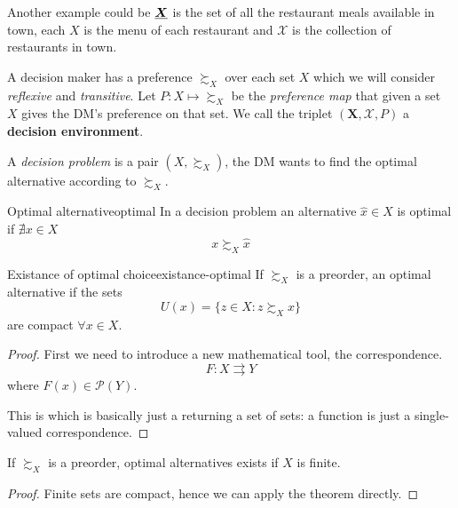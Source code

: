 \documentclass[12pt]{extarticle}
\renewcommand{\vec}[1]{\uvec{#1}}
\begin{document}
Another example could be $\vec X$ is the set of all the restaurant meals available in town, each $X$ is the menu of each restaurant and $\mathcal X$ is the collection of restaurants in town.

A decision maker has a preference $\succsim_X$ over each set $X$
which we will consider \emph{reflexive} and \emph{transitive}.
Let $P: X \mapsto \succsim_X$ be the \emph{preference map} that given a set $X$ gives the DM's preference on that set.
We call the triplet $(\bm X, \mathcal X, P)$ a \textbf{decision environment}.

A \emph{decision problem} is a pair $(X, \succsim_X)$,
the DM wants to find the optimal alternative according to $\succsim_X$.

\begin{definition}{Optimal alternative}{optimal}
    In a decision problem an alternative $\hat x \in X$ is optimal if $\nexists x \in X$
    \begin{equation}
        x \succsim_X \hat  x
    \end{equation}
\end{definition}

\begin{theorem}{Existance of optimal choice}{existance-optimal}
    If $\succsim_X$ is a preorder, an optimal alternative if the sets
    \begin{equation}
        U(x) = \{ z \in X : z \succsim_X x \}
    \end{equation}
    are compact $\forall x \in X$.
\end{theorem}

\begin{proof}
    First we need to introduce a new mathematical tool, the correspondence.
    \begin{equation}
        F:X  \rightrightarrows Y
    \end{equation}
    where $F(x) \in \mathcal P(Y)$.

    This is which is basically just a  returning a set of sets: a function is just a single-valued correspondence.

\end{proof}

\begin{corollary}{}{}
    If $\succsim_X$ is a preorder, optimal alternatives exists if $X$ is finite.
\end{corollary}

\begin{proof}
    Finite sets are compact, hence we can apply the theorem directly.
\end{proof}
\end{document}
